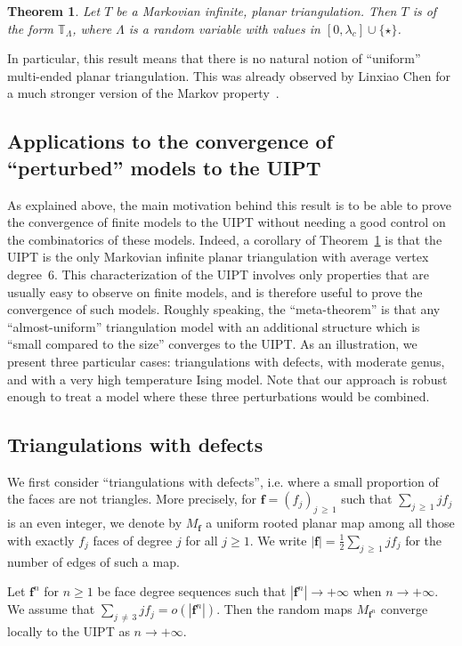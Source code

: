 \documentclass[10pt]{amsart}
\newtheorem{theo}{Theorem}[section]
\theoremstyle{definition}\newtheorem{defi}[theo]{Definition}\newtheorem{rema}[theo]{Remark}\newtheorem{exam}[theo]{Example}\newtheorem{exem}[theo]{Example}\newtheorem{nota}[theo]{Notation}
\newcommand{\TT}{\mathbb{T}}
\newcommand{\bff}{\mathbf{f}}
\begin{document}
\begin{theo}\label{main_thm}
Let $T$ be a Markovian infinite, planar triangulation. Then $T$ is of the form $\TT_{\Lambda}$, where $\Lambda$ is a random variable with values in $[0,\lambda_c] \cup \{ \star \}$.
\end{theo}

In particular, this result means that there is no natural notion of ``uniform'' multi-ended planar triangulation. This was already observed by Linxiao Chen for a much stronger version of the Markov property~\cite{ChPerso}.

\subsection*{Applications to the convergence of ``perturbed'' models to the UIPT}
As explained above, the main motivation behind this result is to be able to prove the convergence of finite models to the UIPT without needing a good control on the combinatorics of these models. Indeed, a corollary of Theorem~\ref{main_thm} is that the UIPT is the only Markovian infinite planar triangulation with average vertex degree~$6$. This characterization of the UIPT involves only properties that are usually easy to observe on finite models, and is therefore useful to prove the convergence of such models. Roughly speaking, the ``meta-theorem'' is that any ``almost-uniform'' triangulation model with an additional structure which is ``small compared to the size'' converges to the UIPT. As an illustration, we present three particular cases: triangulations with defects, with moderate genus, and with a very high temperature Ising model. Note that our approach is robust enough to treat a model where these three perturbations would be combined.

\subsection*{Triangulations with defects}
We first consider ``triangulations with defects'', i.e. where a small proportion of the faces are not triangles. More precisely, for $\bff=(f_j)_{j\,\geq\,1}$ such that $\sum_{j\,\geq\,1} j f_j$ is an even integer, we denote by $M_{\bff}$ a uniform rooted planar map among all those with exactly $f_j$ faces of degree $j$ for all $j \geq 1$. We write $|\bff|=\frac{1}{2} \sum_{j\,\geq\,1} j f_j$ for the number of edges of such a map.

\begin{coro}\label{cor_triang_with_defects}
Let $\bff^n$ for $n \geq 1$ be face degree sequences such that $|\bff^n| \to +\infty$ when $n \to +\infty$. We assume that $\sum_{j\,\ne\,3} j f_j = o (|\bff^n|)$. Then the random maps $M_{\bff^n}$ converge locally to the UIPT as $n \to +\infty$.
\end{coro}
\end{document}
